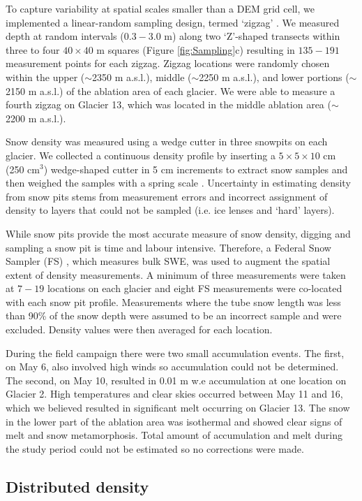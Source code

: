 \documentclass[twocolumn,letterpaper]{igs}
\begin{document}
To capture variability at spatial scales smaller than a DEM grid cell, we implemented a linear-random sampling design, termed `zigzag' \citep{Shea2010}. We measured depth at random intervals ($0.3 - 3.0$ m) along two `Z'-shaped transects within three to four $40\times40$ m squares (Figure \ref{fig:Sampling}c) resulting in $135-191$ measurement points for each zigzag. Zigzag locations were randomly chosen within the upper ($\sim$2350 m a.s.l.), middle ($\sim$2250 m a.s.l.), and lower portions ($\sim$2150 m a.s.l.) of the ablation area of each glacier. We were able to measure a fourth zigzag on Glacier 13, which was located in the middle ablation area ($\sim$2200 m a.s.l.).

Snow density was measured using a wedge cutter in three snowpits on each glacier. We collected a continuous density profile by inserting a $5\times5\times 10$ cm (250 cm$^3$) wedge-shaped cutter in 5 cm increments to extract snow samples and then weighed the samples with a spring scale \citep[e.g.][]{Gray1981,Fierz2009}. Uncertainty in estimating density from snow pits stems from measurement errors and incorrect assignment of density to layers that could not be sampled (i.e. ice lenses and `hard' layers). 

While snow pits provide the most accurate measure of snow density, digging and sampling a snow pit is time and labour intensive. Therefore, a Federal Snow Sampler (FS) \citep{Clyde1932}, which measures bulk SWE, was used to augment the spatial extent of density measurements. A minimum of three measurements were taken at $7-19$ locations on each glacier and eight FS measurements were co-located with each snow pit profile. Measurements where the tube snow length was less than 90\% of the snow depth were assumed to be an incorrect sample and were excluded. Density values were then averaged for each location. 

During the field campaign there were two small accumulation events. The first, on May 6, also involved high winds so accumulation could not be determined. The second, on May 10, resulted in 0.01 m w.e accumulation at one location on Glacier 2. High temperatures and clear skies occurred between May 11 and 16, which we believed resulted in significant melt occurring on Glacier 13. The snow in the lower part of the ablation area was isothermal and showed clear signs of melt and snow metamorphosis. Total amount of accumulation and melt during the study period could not be estimated so no corrections were made. 

\subsection{Distributed density}
\end{document}
